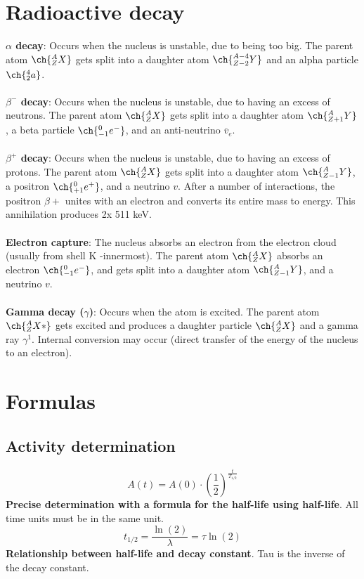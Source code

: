 \chapter{Radioactive decay}
\textbf{$\alpha$ decay}: Occurs when the nucleus is unstable, due to being too big. The parent atom $\ch{^{A}_{Z}X}$ gets split into a daughter atom $\ch{^{A-4}_{Z-2}Y}$ and an alpha particle $\ch{^{4}_{2}a}$.\\\\
\textbf{$\beta^{-}$ decay}: Occurs when the nucleus is unstable, due to having an excess of neutrons. The parent atom $\ch{^{A}_{Z}X}$ gets split into a daughter atom $\ch{^{A}_{Z+1}Y}$, a beta particle $\ch{^{0}_{-1}e^{-}}$, and an anti-neutrino $\overline{v}_e$.\\\\
\textbf{$\beta^{+}$ decay}: Occurs when the nucleus is unstable, due to having an excess of protons. The parent atom $\ch{^{A}_{Z}X}$ gets split into a daughter atom $\ch{^{A}_{Z-1}Y}$, a positron $\ch{^{0}_{+1}e^{+}}$, and a neutrino $v$. After a number of interactions, the positron $\beta{+}$ unites with an electron and converts its entire mass to energy. This annihilation produces 2x 511 keV.\\\\
\textbf{Electron capture}: The nucleus absorbs an electron from the electron cloud (usually from shell K -innermost). The parent atom $\ch{^{A}_{Z}X}$ absorbs an electron $\ch{^{0}_{-1}e^{-}}$, and gets split into a daughter atom $\ch{^{A}_{Z-1}Y}$, and a neutrino $v$.\\\\
\textbf{Gamma decay ($\gamma$)}: Occurs when the atom is excited. The parent atom $\ch{^{A}_{Z}X*}$ gets excited and produces a daughter particle $\ch{^{A}_{Z}X}$ and a gamma ray $\gamma^{1}$. Internal conversion may occur (direct transfer of the energy of the nucleus to an electron).
\chapter{Formulas}
\section{Activity determination}
\[A(t) = A(0) \cdot (\frac{1}{2})^{\frac{t}{T_{1/2}}}\]
\textbf{Precise determination with a formula for the half-life using half-life}. All time units must be in the same unit.\\
\[t_{1/2} = \frac{\ln (2)}{\lambda} = \tau \ln (2)\]
\textbf{Relationship between half-life and decay constant}. Tau is the inverse of the decay constant.\\

